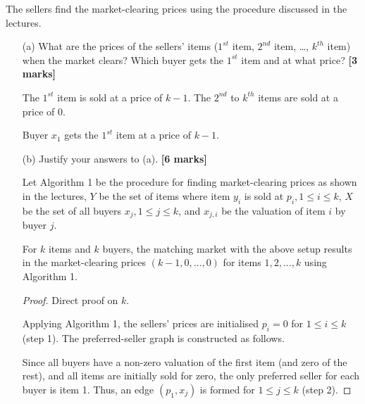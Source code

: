 \noindent The sellers find the market-clearing prices using the procedure discussed in the lectures.
\begin{enumerate}
    \item[(a)] What are the prices of the sellers' items ($1^{st}$ item, $2^{nd}$ item, \ldots, $k^{th}$ item) when the market clears? Which buyer gets the $1^{st}$ item and at what price?  \hfill{\bf [3 marks]}\smallskip

    The $1^{st}$ item is sold at a price of $k - 1$.
    The $2^{nd}$ to $k^{th}$ items are sold at a price of $0$.

    Buyer $x_1$ gets the $1^{st}$ item at a price of $k - 1$.

    \item[(b)] Justify your answers to (a).  \hfill{\bf [6 marks]}\smallskip

    Let Algorithm 1 be the procedure for finding market-clearing prices as shown in the lectures, $Y$ be the set of items where item $y_i$ is sold at $p_i, 1 \leq i \leq k$, $X$ be the set of all buyers $x_j, 1 \leq j \leq k$, and $x_{j,i}$ be the valuation of item $i$ by buyer $j$.

    \begin{theorem}
        For $k$ items and $k$ buyers, the matching market with the above setup results in the market-clearing prices $(k - 1, 0, \dots, 0)$ for items $1, 2, ..., k$ using Algorithm 1.
    \end{theorem}

    \begin{proof}
        Direct proof on $k$.

        Applying Algorithm 1, the sellers' prices are initialised $p_i = 0$ for $1 \leq i \leq k$ (step 1).
        The preferred-seller graph is constructed as follows.

        Since all buyers have a non-zero valuation of the first item (and zero of the rest), and all items are initially sold for zero, the only preferred seller for each buyer is item 1.
        Thus, an edge $(p_1, x_j)$ is formed for $1 \leq j \leq k$ (step 2).

        \hfil
\end{proof}
\end{enumerate}
